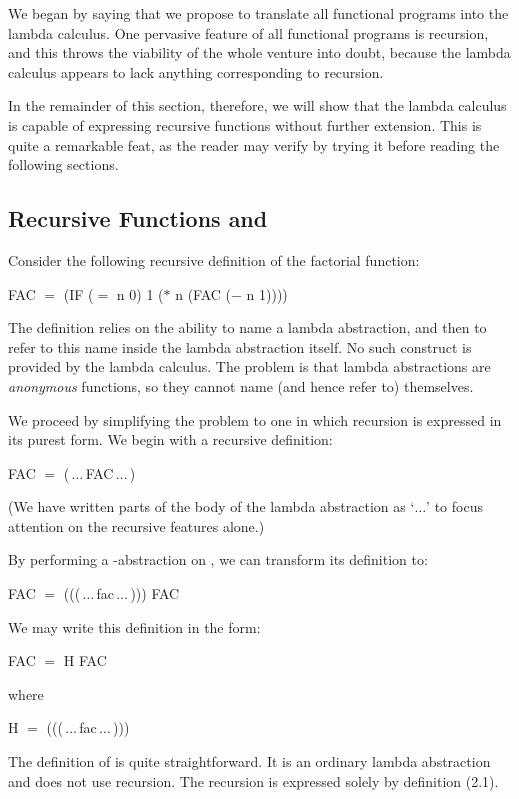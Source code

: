 We began by saying that we propose to translate all functional programs into the lambda calculus. One pervasive feature of all functional programs is recursion, and this throws the viability of the whole venture into doubt, because the lambda calculus appears to lack anything corresponding to recursion.

In the remainder of this section, therefore, we will show that the lambda calculus is capable of expressing recursive functions without further extension. This is quite a remarkable feat, as the reader may verify by trying it before reading the following sections.

\subsection{Recursive Functions and }

Consider the following recursive definition of the factorial function:
\begin{mlcoded}
FAC $=$ (IF ($=$ n 0) 1 ($*$ n (FAC ($-$ n 1))))
\end{mlcoded}
The definition relies on the ability to name a lambda abstraction, and then to refer to this name inside the lambda abstraction itself. No such construct is provided by the lambda calculus. The problem is that lambda abstractions are \textit{anonymous} functions, so they cannot name (and hence refer to) themselves.

We proceed by simplifying the problem to one in which recursion is expressed in its purest form. We begin with a recursive definition:
\begin{mlcoded}
FAC $=$ (\,$\ldots$\,FAC\,$\ldots$\,)
\end{mlcoded}
(We have written parts of the body of the lambda abstraction as `$\ldots$' to focus attention on the recursive features alone.)

By performing a \tb{}-abstraction on , we can transform its definition to:
\begin{mlcoded}
    FAC $=$ (((\,$\ldots$\,fac\,$\ldots$\,))) FAC
\end{mlcoded}
We may write this definition in the form:
\begin{mlnumbered}
FAC $=$ H FAC
\end{mlnumbered}
where
\begin{mlcoded}
    H $=$ (((\,$\ldots$\,fac\,$\ldots$\,)))
\end{mlcoded}
The definition of  is quite straightforward. It is an ordinary lambda abstraction and does not use recursion. The recursion is expressed solely by definition (2.1).

